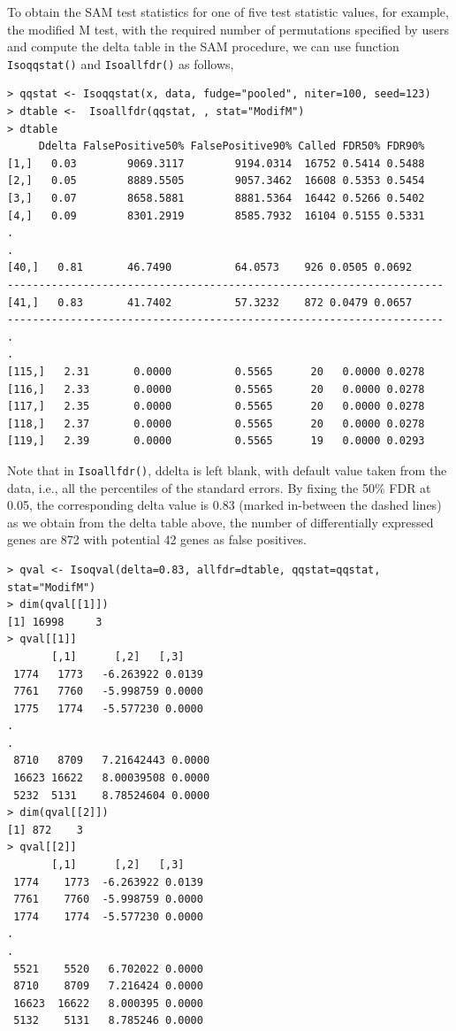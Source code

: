 To obtain the SAM test statistics for one of five test statistic values, for example, the modified M test, 
with the required number of permutations specified by users and compute the
delta table in the SAM procedure, we can use function \texttt{Isoqqstat()} and \texttt{Isoallfdr()} as follows,
\begin{center}
\begin{boxit}
\begin{verbatim}
> qqstat <- Isoqqstat(x, data, fudge="pooled", niter=100, seed=123)
> dtable <-  Isoallfdr(qqstat, , stat="ModifM")
> dtable
     Ddelta FalsePositive50% FalsePositive90% Called FDR50% FDR90%
[1,]   0.03        9069.3117        9194.0314  16752 0.5414 0.5488
[2,]   0.05        8889.5505        9057.3462  16608 0.5353 0.5454
[3,]   0.07        8658.5881        8881.5364  16442 0.5266 0.5402
[4,]   0.09        8301.2919        8585.7932  16104 0.5155 0.5331
.
.
[40,]   0.81       46.7490          64.0573    926 0.0505 0.0692
---------------------------------------------------------------------
[41,]   0.83       41.7402          57.3232    872 0.0479 0.0657
---------------------------------------------------------------------
.
.
[115,]   2.31       0.0000          0.5565      20   0.0000 0.0278
[116,]   2.33       0.0000          0.5565      20   0.0000 0.0278
[117,]   2.35       0.0000          0.5565      20   0.0000 0.0278
[118,]   2.37       0.0000          0.5565      20   0.0000 0.0278
[119,]   2.39       0.0000          0.5565      19   0.0000 0.0293
\end{verbatim}
\end{boxit}
\end{center}
Note that in \texttt{Isoallfdr()}, ddelta is left blank, with default value taken
from the data, i.e., all the percentiles of the standard errors. 
By fixing the 50\% FDR at 0.05, the corresponding delta value is 0.83 
(marked in-between the dashed lines) as we obtain from the delta table above,
the number of differentially expressed genes are 872 with potential 42 genes as false positives.



\begin{center}
\begin{boxit}
\begin{verbatim}
> qval <- Isoqval(delta=0.83, allfdr=dtable, qqstat=qqstat, 
stat="ModifM")
> dim(qval[[1]])
[1] 16998     3
> qval[[1]]
       [,1]      [,2]   [,3]    
 1774   1773   -6.263922 0.0139
 7761   7760   -5.998759 0.0000
 1775   1774   -5.577230 0.0000
.
.
 8710   8709   7.21642443 0.0000
 16623 16622   8.00039508 0.0000
 5232  5131    8.78524604 0.0000
> dim(qval[[2]])
[1] 872    3
> qval[[2]]
       [,1]      [,2]   [,3]
 1774    1773  -6.263922 0.0139
 7761    7760  -5.998759 0.0000
 1774    1774  -5.577230 0.0000
.
.
 5521    5520   6.702022 0.0000
 8710    8709   7.216424 0.0000
 16623  16622   8.000395 0.0000
 5132    5131   8.785246 0.0000
\end{verbatim}
\end{boxit}
\end{center}

